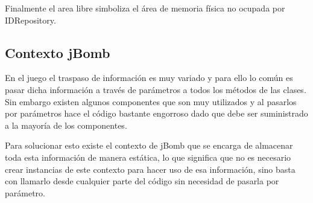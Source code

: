\documentclass[a4paper,12pt,openany,oneside]{book}
\begin{document}
Finalmente el area libre simboliza el área de memoria física no ocupada por IDRepository.
\subsection{Contexto jBomb}
En el juego el traspaso de información es muy variado y para ello lo común es pasar dicha información a través de parámetros a todos los métodos de las clases. Sin embargo existen algunos componentes que son muy utilizados y al pasarlos por parámetros hace el código bastante engorroso dado que debe ser suministrado a la mayoría de los componentes. 

Para solucionar esto existe el contexto de jBomb que se encarga de almacenar toda esta información de manera estática, lo que significa que no es necesario crear instancias de este contexto para hacer uso de esa información, sino basta con llamarlo desde cualquier parte del código sin necesidad de pasarla por parámetro.
\end{document}
